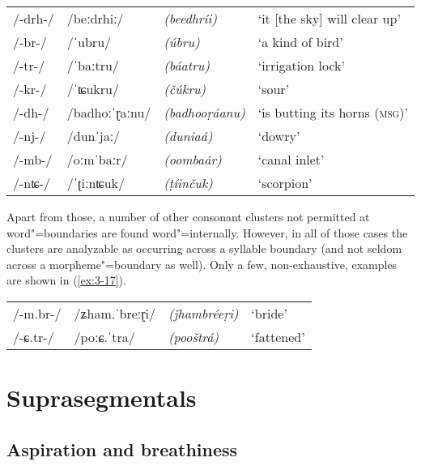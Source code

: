 \begin{exe}
\extab
\label{ex:3-16}
\begin{tabular}{ l l l l }
/-drh-/ &
/beːdrhiː/ &
\textit{(beedhríi)} &
`it [the sky] will clear up'\\
/-br-/ &
/ˈubru/ &
\textit{(úbru)} &
`a kind of bird'\\
/-tr-/ &
/ˈbaːtru/ &
\textit{(báatru)} &
`irrigation lock'\\
/-kr-/ &
/ˈʨukru/ &
\textit{(čúkru)} &
`sour'\\
/-dh-/ &
/badhoːˈɽaːnu/ &
\textit{(badhooṛáanu)} &
`is butting its horns (\textsc{msg)}'\\
/-nj-/ &
/dunˈjaː/ &
\textit{(duniaá)} &
`dowry'\\
/-mb-/ &
/oːmˈbaːr/ &
\textit{(oombaár)} &
`canal inlet'\\
/-nʨ-/ &
/ˈʈiːnʨuk/ &
\textit{(ṭíinčuk)} &
`scorpion'\\
\end{tabular}
\end{exe}


Apart from those, a number of other consonant clusters not permitted at word"=boundaries are found word"=internally. However, in all of those cases the clusters are analyzable as occurring across a syllable boundary (and not seldom across a morpheme"=boundary as well). Only a few, non-exhaustive, examples are shown in (\ref{ex:3-17}).


\begin{exe}
\extab
\label{ex:3-17}
\begin{tabular}{ l l l l }
/-m.br-/ &
/ʑham.ˈbreːɽi/ &
\textit{(ǰhambréeṛi)} &
`bride'\\
/-ɕ.tr-/ &
/poːɕ.ˈtra/ &
\textit{(pooštrá)} &
`fattened'\\

\end{tabular}
\end{exe}


\section{Suprasegmentals}
\label{sec:3-4}

\subsection{Aspiration and breathiness}
\label{subsec:3-4-1}

